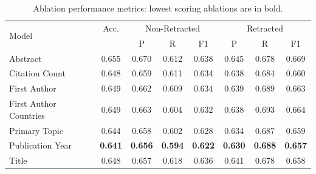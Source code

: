\documentclass[pdflatex,sn-mathphys-num]{sn-jnl}%
\begin{document}
\begin{table}[htbp]
\caption{Ablation performance metrics: lowest scoring ablations are in bold.}\label{tab:ablation}
\small
\begin{tabular}{l*{7}{c}}
\toprule
\multirow{2}{*}{Model} & \multirow{1}{*}{Acc.}  & \multicolumn{3}{c}{Non-Retracted} & \multicolumn{3}{c}{Retracted} \\
\cmidrule(lr){3-5} \cmidrule(lr){6-8}
 & & P & R & F1 & P & R & F1 \\
\midrule
Abstract & 0.655 & 0.670 & 0.612 & 0.638 & 0.645 & 0.678 & 0.669 \\
Citation Count & 0.648 & 0.659 & 0.611 & 0.634 & 0.638 & 0.684 & 0.660 \\
First Author & 0.649 & 0.662 & 0.609 & 0.634 & 0.639 & 0.689 & 0.663 \\
First Author Countries & 0.649 & 0.663 & 0.604 & 0.632 & 0.638 & 0.693 & 0.664 \\
Primary Topic & 0.644 & 0.658 & 0.602 & 0.628 & 0.634 & 0.687 & 0.659 \\
Publication Year & \textbf{0.641} & \textbf{0.656} & \textbf{0.594} & \textbf{0.622} & \textbf{0.630} & \textbf{0.688} & \textbf{0.657} \\
Title & 0.648 & 0.657 & 0.618 & 0.636 & 0.641 & 0.678 & 0.658 \\
\bottomrule
\end{tabular}
\end{table}
\end{document}
